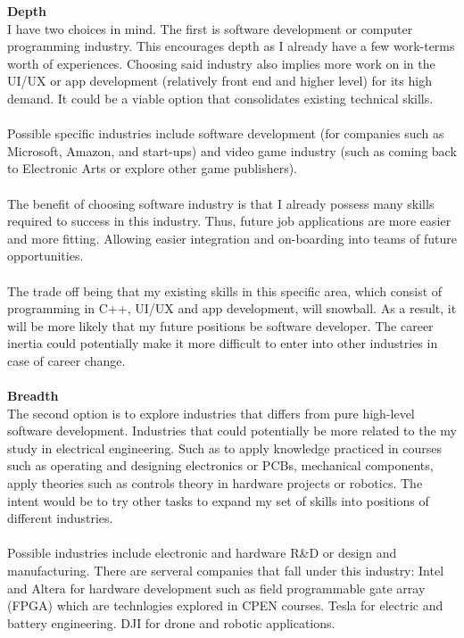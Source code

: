 \documentclass[10pt,letterpaper]{article}
\begin{document}
\textbf{Depth}\\
I have two choices in mind. The first is software development or computer programming industry. This encourages depth as I already have a few work-terms worth of experiences. Choosing said industry also implies more work on in the UI/UX or app development (relatively front end and higher level) for its high demand. It could be a viable option that consolidates existing technical skills.\\
\\
Possible specific industries include software development (for companies such as Microsoft, Amazon, and start-ups) and video game industry (such as coming back to Electronic Arts or explore other game publishers).\\
\\
The benefit of choosing software industry is that I already possess many skills required to success in this industry. Thus, future job applications are more easier and more fitting. Allowing easier integration and on-boarding into teams of future opportunities.\\
\\
The trade off being that my existing skills in this specific area, which consist of programming in C++, UI/UX and app development, will snowball. As a result, it will be more likely that my future positions be software developer. The career inertia could potentially make it more difficult to enter into  other industries in case of career change.\\
\\
\textbf{Breadth}\\
The second option is to explore industries that differs from pure high-level software development. Industries that could potentially be more related to the my study in electrical engineering. Such as to apply knowledge practiced in courses such as operating and designing electronics or PCBs, mechanical components, apply theories such as controls theory in hardware projects or robotics. The intent would be to try other tasks to expand my set of skills into positions of different industries.\\
\\
Possible industries include electronic and hardware R\&D or design and manufacturing. There are serveral companies that fall under this industry: Intel and Altera for hardware development such as field programmable gate array (FPGA) which are technlogies explored in CPEN courses. Tesla for electric and battery engineering. DJI for drone and robotic applications.\\
\end{document}
